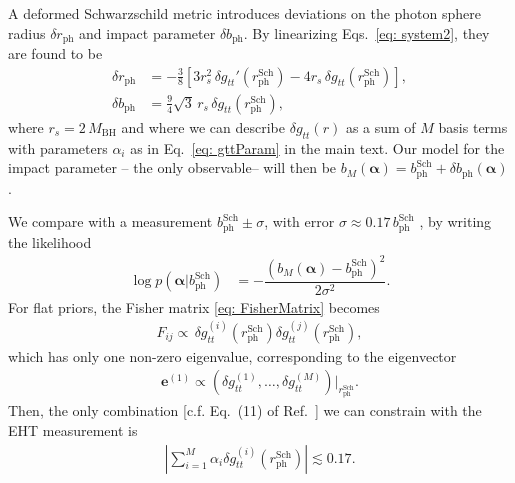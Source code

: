 \documentclass[%
nofootinbib,
 amsmath,amssymb,
 aps,
floatfix,
twocolumn
]{revtex4-2}
\begin{document}
A deformed Schwarzschild metric introduces deviations on the photon sphere radius \(\delta r_\text{ph}\) and impact parameter \(\delta b_\text{ph}\). By linearizing Eqs.~\eqref{eq: system2}, they are found to be
%
\begin{align}\label{eq: deltarb}
    \delta r_\text{ph} &= -\frac{3}{8} \left[3 r_s^2 \,\delta g_{tt} '\left(r_\text{ph}^\text{Sch}\right)-4 r_s \,\delta g_{tt} \left(r_\text{ph}^\text{Sch}\right)\right], \nonumber\\
    \delta b_\text{ph} &= \frac{9}{4} \sqrt{3}\, r_s \,\delta g_{tt} \left(r_\text{ph}^\text{Sch}\right),
\end{align}
where \(r_s = 2 \, M_\text{BH}\) and where we can describe \(\delta g_{tt}(r)\) as a sum of \(M\) basis terms with parameters \(\alpha_i\) as in Eq.~\eqref{eq: gttParam} in the main text. Our model for the impact parameter -- the only observable-- will then be \(b_M\left(\boldsymbol{\alpha}\right) = b_\text{ph}^\text{Sch}  + \delta b_\text{ph}\left(\boldsymbol{\alpha}\right)\).

We compare with a measurement \(b_\text{ph}^\text{Sch} \pm \sigma \), with error \(\sigma \approx 0.17 \, b_\text{ph}^\text{Sch}\) \cite{PhysRevLett.125.141104}, by writing the likelihood
%
\begin{align}
    \log p( \boldsymbol{\alpha} \lvert  b_\text{ph}^\text{Sch}) & = -\dfrac{\left(b_M \left(\boldsymbol{\alpha}\right) - b_\text{ph}^\text{Sch}\right)^2}{2\sigma^2}.
\end{align}
%
For flat priors, the Fisher matrix \eqref{eq: FisherMatrix} becomes
%
\begin{align}
    F_{ij} \propto \, \delta g^{(i)}_{tt} \left(r_\text{ph}^\text{Sch}\right)\delta g_{tt}^{(j)} \left(r_\text{ph}^\text{Sch}\right),
\end{align}
%
which has only one non-zero eigenvalue, corresponding to the eigenvector 
%
\begin{align}
\boldsymbol{e}^{(1)} \propto  \left(\delta g_{tt}^{(1)}, \dots, \delta g_{tt}^{(M)}\right)\rvert_{r_\text{ph}^\text{Sch} }.
\end{align}
%
Then, the only combination [c.f. Eq.~(11) of Ref.~\cite{Volkel:2020xlc}] we can constrain with the EHT measurement is 
%
\begin{align}
    \left \lvert  \sum_{i = 1}^{M} \alpha_i \delta g_{tt}^{(i)} \left(r_\text{ph}^\text{Sch}\right)  \right \rvert  \lesssim  0.17 .
\end{align}


\end{document}
